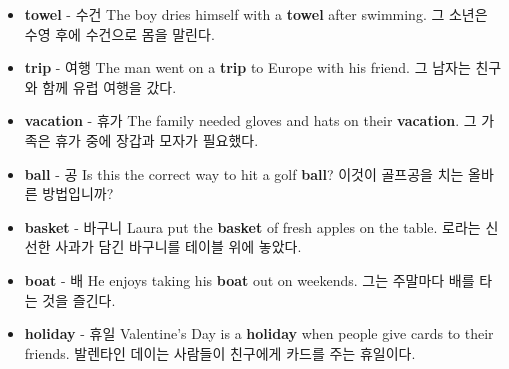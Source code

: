 \documentclass{article}
\begin{document}
\begin{addmargin}[1em]{1em}
\begin{itemize}
        \item \fontsize{12pt}{14pt}\selectfont \textbf{towel} - 수건 \newline
        The boy dries himself with a \textbf{towel} after swimming. \newline
        그 소년은 수영 후에 수건으로 몸을 말린다.
        
        \item \fontsize{12pt}{14pt}\selectfont \textbf{trip} - 여행 \newline
        The man went on a \textbf{trip} to Europe with his friend. \newline
        그 남자는 친구와 함께 유럽 여행을 갔다.
        
        \item \fontsize{12pt}{14pt}\selectfont \textbf{vacation} - 휴가 \newline
        The family needed gloves and hats on their \textbf{vacation}. \newline
        그 가족은 휴가 중에 장갑과 모자가 필요했다.
        
        \item \fontsize{12pt}{14pt}\selectfont \textbf{ball} - 공 \newline
        Is this the correct way to hit a golf \textbf{ball}? \newline
        이것이 골프공을 치는 올바른 방법입니까?
        
        \item \fontsize{12pt}{14pt}\selectfont \textbf{basket} - 바구니 \newline
        Laura put the \textbf{basket} of fresh apples on the table. \newline
        로라는 신선한 사과가 담긴 바구니를 테이블 위에 놓았다.
        
        \item \fontsize{12pt}{14pt}\selectfont \textbf{boat} - 배 \newline
        He enjoys taking his \textbf{boat} out on weekends. \newline
        그는 주말마다 배를 타는 것을 즐긴다.
        
        \item \fontsize{12pt}{14pt}\selectfont \textbf{holiday} - 휴일 \newline
        Valentine's Day is a \textbf{holiday} when people give cards to their friends. \newline
        발렌타인 데이는 사람들이 친구에게 카드를 주는 휴일이다.
        

\end{itemize}
\end{addmargin}
\end{document}
